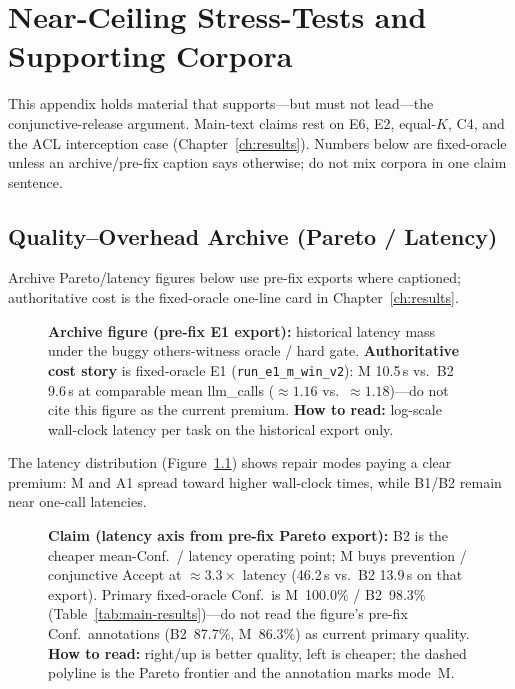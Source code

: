 
\chapter{Near-Ceiling Stress-Tests and Supporting Corpora}
\label{app:stress}

This appendix holds material that supports---but must not lead---the
conjunctive-release argument.
Main-text claims rest on E6, E2, equal-$K$, C4, and the ACL interception case
(Chapter~\ref{ch:results}).
Numbers below are fixed-oracle unless an archive/pre-fix caption says
otherwise; do not mix corpora in one claim sentence.

\section{Quality--Overhead Archive (Pareto / Latency)}

Archive Pareto/latency figures below use pre-fix exports where captioned;
authoritative cost is the fixed-oracle one-line card in Chapter~\ref{ch:results}.

\begin{figure}[t]
  \centering
  \caption{\textbf{Archive figure (pre-fix E1 export):} historical latency
    mass under the buggy others-witness oracle / hard gate.
    \textbf{Authoritative cost story} is fixed-oracle E1
    (\texttt{run\_e1\_m\_win\_v2}): M 10.5\,s vs.\ B2 9.6\,s at comparable
    mean llm\_calls (${\approx}1.16$ vs.\ ${\approx}1.18$)---do not cite this
    figure as the current premium.
    \textbf{How to read:} log-scale wall-clock latency per task on the
    historical export only.}
  \label{fig:latency-distribution}
\end{figure}

The latency distribution (Figure~\ref{fig:latency-distribution}) shows repair
modes paying a clear premium: M and A1 spread toward higher wall-clock times,
while B1/B2 remain near one-call latencies.

\begin{figure}[t]
  \centering
  \caption{\textbf{Claim (latency axis from pre-fix Pareto export):}
    B2 is the cheaper mean-Conf.\ / latency operating point; M buys
    prevention / conjunctive Accept at ${\approx}3.3\times$ latency
    (46.2\,s vs.\ B2 13.9\,s on that export).
    Primary fixed-oracle Conf.\ is M~100.0\% / B2~98.3\%
    (Table~\ref{tab:main-results})---do not read the figure's pre-fix
    Conf.\ annotations (B2~87.7\%, M~86.3\%) as current primary quality.
    \textbf{How to read:} right/up is better quality, left is cheaper; the
    dashed polyline is the Pareto frontier and the annotation marks mode~M.}
  \label{fig:pareto}
\end{figure}

